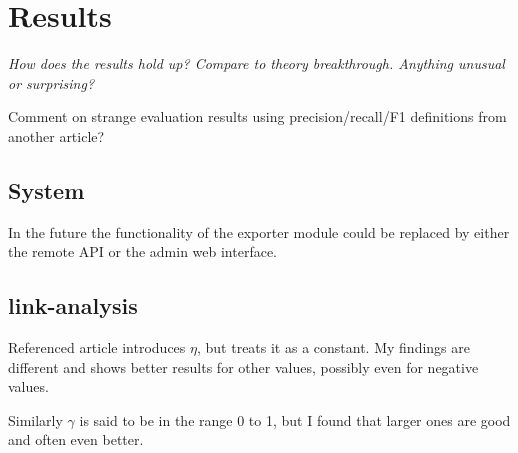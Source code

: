 
\section{Results}\label{sec:disc:results}

\textit{How does the results hold up? Compare to theory breakthrough. Anything unusual or surprising?}

Comment on strange evaluation results using precision/recall/F1 definitions from another article?

\subsection{System}

In the future the functionality of the exporter module could be replaced by either the remote API or the admin web interface.


\subsection{link-analysis}

Referenced article introduces $\eta$, but treats it as a constant. My findings are different and shows better results for other values, possibly even for negative values.

Similarly $\gamma$ is said to be in the range 0 to 1, but I found that larger ones are good and often even better.

